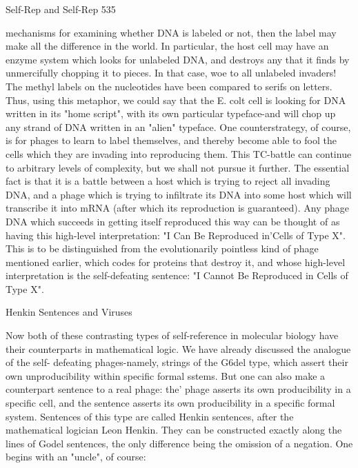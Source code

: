 {Self-Rep and Self-Rep                                                                          535

mechanisms for examining whether DNA is labeled or not, then the label may make all the
difference in the world. In particular, the host cell may have an enzyme system which looks
for unlabeled DNA, and destroys any that it finds by unmercifully chopping it to pieces. In
that case, woe to all unlabeled invaders!
         The methyl labels on the nucleotides have been compared to serifs on letters. Thus,
using this metaphor, we could say that the E. colt cell is looking for DNA written in its
"home script", with its own particular typeface-and will chop up any strand of DNA written
in an "alien" typeface. One counterstrategy, of course, is for phages to learn to label
themselves, and thereby become able to fool the cells which they are invading into
reproducing them.
         This TC-battle can continue to arbitrary levels of complexity, but we shall not pursue
it further. The essential fact is that it is a battle between a host which is trying to reject all
invading DNA, and a phage which is trying to infiltrate its DNA into some host which will
transcribe it into mRNA (after which its reproduction is guaranteed). Any phage DNA which
succeeds in getting itself reproduced this way can be thought of as having this high-level
interpretation: "I Can Be Reproduced in'Cells of Type X". This is to be distinguished from
the evolutionarily pointless kind of phage mentioned earlier, which codes for proteins that
destroy it, and whose high-level interpretation is the self-defeating sentence: "I Cannot Be
Reproduced in Cells of Type X".

                                Henkin Sentences and Viruses

Now both of these contrasting types of self-reference in molecular biology have their
counterparts in mathematical logic. We have already discussed the analogue of the self-
defeating phages-namely, strings of the G6del type, which assert their own unproducibility
within specific formal sstems. But one can also make a counterpart sentence to a real phage:
the' phage asserts its own producibility in a specific cell, and the sentence asserts its own
producibility in a specific formal system. Sentences of this type are called Henkin sentences,
after the mathematical logician Leon Henkin. They can be constructed exactly along the lines
of Godel sentences, the only difference being the omission of a negation. One begins with an
"uncle", of course:

}
